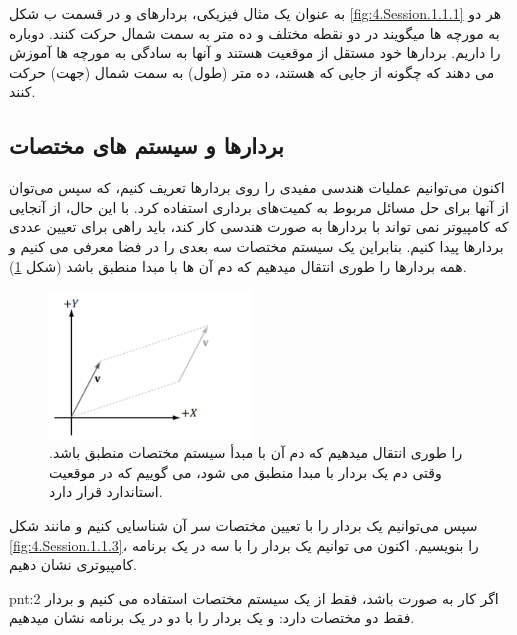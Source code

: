 {\begin{spacing}{1.4}
        به عنوان یک مثال فیزیکی، بردارهای  و  در قسمت ب شکل \ref{fig:4.Session.1.1.1} هر دو به مورچه ها میگویند در دو نقطه مختلف  و  ده متر به سمت شمال حرکت کنند.
        دوباره  را داریم.
        بردارها خود مستقل از موقعیت هستند و
        آنها به سادگی به مورچه ها آموزش می دهند که چگونه از جایی که هستند، ده متر (طول) به سمت شمال (جهت) حرکت کنند.

    \end{spacing}
}

\subsection{\textbf{بردارها و سیستم های مختصات}}
{
    \Large
    \begin{spacing}{1.5}
        اکنون می‌توانیم عملیات هندسی مفیدی را روی بردارها تعریف کنیم، که سپس می‌توان از آنها برای حل مسائل مربوط به کمیت‌های برداری استفاده کرد.
        با این حال، از آنجایی که کامپیوتر نمی تواند با بردارها به صورت هندسی کار کند، باید راهی برای تعیین عددی بردارها پیدا کنیم.
        بنابراین یک سیستم مختصات سه بعدی را در فضا معرفی می کنیم و همه بردارها را طوری انتقال میدهیم که دم آن ها با مبدا منطبق باشد (شکل \ref{fig:4.Session.1.1.2}).

        \begin{figure}[H]
            \centering
            \setlength{\belowcaptionskip}{-10pt}
            \includegraphics[width=0.48\textwidth]{Images/4/4.Session.1.1.2}
            \caption{ را طوری انتقال میدهیم که دم آن با مبدأ سیستم مختصات منطبق
            باشد. وقتی دم یک بردار با مبدا منطبق می شود، می گوییم که در موقعیت استاندارد قرار دارد.}
            \label{fig:4.Session.1.1.2}
        \end{figure}

        سپس می‌توانیم یک بردار را با تعیین مختصات سر آن شناسایی کنیم و مانند شکل \ref{fig:4.Session.1.1.3}،  را بنویسیم.
        اکنون می توانیم یک بردار را با سه  در یک برنامه کامپیوتری نشان دهیم.

        \begin{point}{pnt:2}
            \Large
            اگر کار به صورت  باشد، فقط از یک سیستم مختصات  استفاده می کنیم و بردار فقط دو مختصات دارد:
             و یک بردار را با دو  در یک برنامه نشان میدهیم.
        \end{point}


\end{spacing}}
